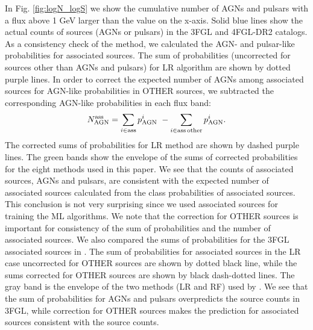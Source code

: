 \documentclass[referee]{aa} %
\newcommand{\bea}{\begin{eqnarray}}
\newcommand{\eea}{\end{eqnarray}}
\newcommand{\lb}{\label}
\begin{document}
In Fig. \ref{fig:logN_logS} we show the cumulative number of AGNs and pulsars with a flux above 1 GeV larger than the
value on the x-axis.
Solid blue lines show the actual counts of sources (AGNs or pulsars) in the 3FGL and 4FGL-DR2 catalogs.
As a consistency check of the method, we calculated the AGN- and pulsar-like probabilities for associated sources.
The sum of probabilities (uncorrected for sources other than AGNs and pulsars) for LR algorithm are shown by dotted purple lines.
In order to correct the expected number of AGNs among associated sources for AGN-like probabilities in OTHER sources, 
we subtracted the corresponding AGN-like probabilities in each flux band:
\bea
\lb{eq:assoc_ev}
N_{\rm AGN}^{\rm ass}  = \sum_{i \in \rm ass} p^i_{\rm AGN}\,\, - \sum_{i \in \rm ass\,other} p^i_{\rm AGN}.
\eea
The corrected sums of probabilities for LR method are shown by dashed purple lines.
The green bands show the envelope of the sums of corrected probabilities for the eight methods used in this paper.
We see that the counts of associated sources, AGNs and pulsars, are consistent with the expected number of associated sources
calculated from the class probabilities of associated sources.
This conclusion is not very surprising since we used associated sources for training the ML algorithms.
We note that the correction for OTHER sources is important for consistency of the sum of probabilities and the number of associated sources.
We also compared the sums of probabilities for the 3FGL associated sources in \cite{2016ApJ...820....8S}.
The sum of probabilities for associated sources in the LR case uncorrected for OTHER sources are shown by dotted black line,
while the sums corrected for OTHER sources are shown by black dash-dotted lines.
The gray band is the envelope of the two methods (LR and RF) used by \cite{2016ApJ...820....8S}.
We see that the sum of probabilities for AGNs and pulsars overpredicts the source counts in 3FGL, 
while correction for OTHER sources makes the prediction for associated sources consistent with the source counts.
\end{document}

